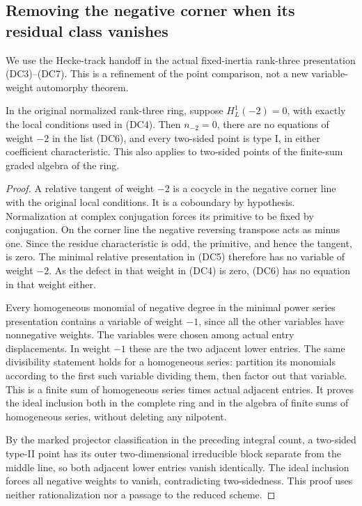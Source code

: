 \subsection{Removing the negative corner when its residual class vanishes}
\label{sec:rank-three-corner-elimination}

We use the Hecke-track handoff in the actual fixed-inertia
rank-three presentation (DC3)--(DC7).  This is a refinement of
the point comparison, not a new variable-weight automorphy theorem.

\begin{proposition}
\label{prop:rank-three-corner-elimination}
In the original normalized rank-three ring, suppose
\(H^1_L(-2)=0\), with exactly the local conditions used in
(DC4).  Then \(n_{-2}=0\), there are no equations of weight
\(-2\) in the list (DC6), and every two-sided point is type I,
in either coefficient characteristic.  This also applies
to two-sided points of the finite-sum graded algebra
of the ring.
\end{proposition}
\begin{proof}
A relative tangent of weight \(-2\) is a cocycle in the
negative corner line with the original local conditions.
It is a coboundary by hypothesis.  Normalization at complex
conjugation forces its primitive to be fixed by conjugation.
On the corner line the negative reversing transpose acts
as minus one.  Since the residue characteristic is odd,
the primitive, and hence the tangent, is zero.
The minimal relative presentation in (DC5) therefore
has no variable of weight \(-2\).
As the defect in that weight in (DC4) is zero, (DC6)
has no equation in that weight either.

Every homogeneous monomial of negative degree in the
minimal power series presentation contains a variable
of weight \(-1\), since all the other variables have
nonnegative weights.  The variables were chosen among
actual entry displacements.  In weight \(-1\) these are
the two adjacent lower entries.  The same divisibility
statement holds for a homogeneous series: partition its
monomials according to the first such variable dividing
them, then factor out that variable.  This is a finite
sum of homogeneous series times actual adjacent entries.
It proves the ideal inclusion both in the complete ring
and in the algebra of finite sums of homogeneous series,
without deleting any nilpotent.

By the marked projector classification in the preceding
integral count, a two-sided type-II point has its outer
two-dimensional irreducible block separate from the
middle line, so both adjacent lower entries vanish
identically.  The ideal inclusion forces all negative
weights to vanish, contradicting two-sidedness.
This proof uses neither rationalization nor a passage to
the reduced scheme.
\end{proof}

